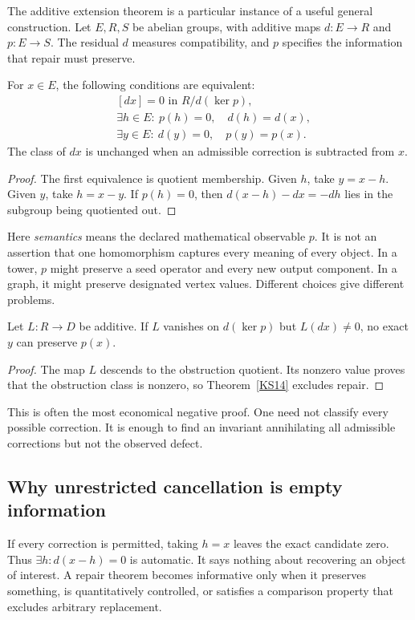 \label{sec:protected}
The additive extension theorem is a particular instance of a useful general construction. Let \(E,R,S\) be abelian groups, with additive maps \(d:E\to R\) and \(p:E\to S\). The residual \(d\) measures compatibility, and \(p\) specifies the information that repair must preserve.

\begin{theorem}\label{KS14}
For \(x\in E\), the following conditions are equivalent:
\[
\begin{aligned}
 &[dx]=0\text{ in }R/d(\ker p),\\
 &\exists h\in E:\ p(h)=0,\quad d(h)=d(x),\\
 &\exists y\in E:\ d(y)=0,\quad p(y)=p(x).
\end{aligned}
\]
The class of \(dx\) is unchanged when an admissible correction is subtracted from \(x\).
\end{theorem}
\begin{proof}
The first equivalence is quotient membership. Given \(h\), take \(y=x-h\). Given \(y\), take \(h=x-y\). If \(p(h)=0\), then \(d(x-h)-dx=-dh\) lies in the subgroup being quotiented out.
\end{proof}
Here \emph{semantics} means the declared mathematical observable \(p\). It is not an assertion that one homomorphism captures every meaning of every object. In a tower, \(p\) might preserve a seed operator and every new output component. In a graph, it might preserve designated vertex values. Different choices give different problems.

\begin{proposition}\label{KS15}
Let \(L:R\to D\) be additive. If \(L\) vanishes on \(d(\ker p)\) but \(L(dx)\ne0\), no exact \(y\) can preserve \(p(x)\).
\end{proposition}
\begin{proof}
The map \(L\) descends to the obstruction quotient. Its nonzero value proves that the obstruction class is nonzero, so Theorem~\ref{KS14} excludes repair.
\end{proof}
This is often the most economical negative proof. One need not classify every possible correction. It is enough to find an invariant annihilating all admissible corrections but not the observed defect.

\subsection{Why unrestricted cancellation is empty information}
If every correction is permitted, taking \(h=x\) leaves the exact candidate zero. Thus \(\exists h:d(x-h)=0\) is automatic. It says nothing about recovering an object of interest. A repair theorem becomes informative only when it preserves something, is quantitatively controlled, or satisfies a comparison property that excludes arbitrary replacement.

